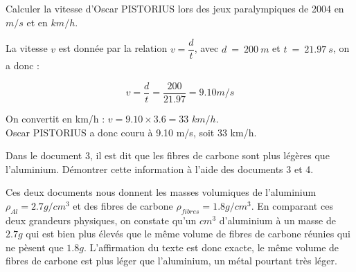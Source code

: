 \documentclass[a4paper,12pt]{exam}
\begin{document}
\newpage
\begin{questions}
	\question Calculer la vitesse d'Oscar PISTORIUS lors des jeux paralympiques de 2004 en $m/s$ et en $km/h$.
	
	\begin{solution}
		La vitesse $v$ est donnée par la relation $v=\dfrac{d}{t}$, avec $d\:=\:200\:m$ et $t\:=\:\num{21.97}\:s$, on a donc :
		
		\begin{equation*}
			v = \dfrac{d}{t} = \dfrac{200}{\num{21.97}} = \num{9.10} m/s
		\end{equation*}
		
		On convertit en km/h : $v=\num{9.10} \times \num{3.6} = 33$ $km/h$.\\
		
		Oscar PISTORIUS a donc couru à \num{9.10} m/s, soit 33 km/h.
	\end{solution}
	
	\question Dans le document 3, il est dit que les fibres de carbone sont plus légères que l'aluminium. Démontrer cette information à l'aide des documents 3 et 4.
	
	\begin{solution}
		Ces deux documents nous donnent les masses volumiques de l'aluminium $\rho_{Al} = \num{2.7} g/cm^3$ et des fibres de carbone $\rho_{fibres} = \num{1.8} g/cm^3$. En comparant ces deux grandeurs physiques, on constate qu'un $cm^3$ d'aluminium à un masse de $\num{2.7} g$ qui est bien plus élevés que le même volume de fibres de carbone réunies qui ne pèsent que $\num{1.8} g $. L'affirmation du texte est donc exacte, le même volume de fibres de carbone est plus léger que l'aluminium, un métal pourtant très léger.
	\end{solution}
	
	\question 
\end{questions}
\end{document}
